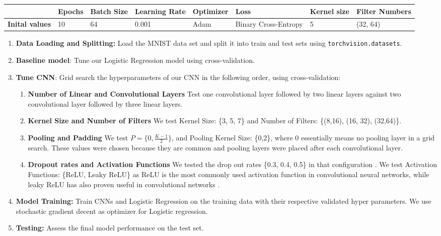 \begin{table}[]
\begin{tabular}{|l|l|l|l|l|l|l|l|}
\hline
                       & \textbf{Epochs} & \textbf{Batch Size} & \textbf{Learning Rate} & \textbf{Optimizer} & \textbf{Loss}        & \textbf{Kernel size} & \textbf{Filter Numbers} \\ \hline
\textbf{Inital values} & 10              & 64                  & 0.001                  & Adam               & Binary Cross-Entropy & 5                    & (32, 64)                \\ \hline
\end{tabular}
\end{table}

\begin{enumerate}
    \item \textbf{Data Loading and Splitting:} Load the MNIST data set and split it into train and test sets using     \texttt{torchvision.datasets}. 
    \item \textbf{Baseline model}: Tune our Logistic Regression model using cross-validation.
    \item \textbf{Tune CNN}: Grid search the hyperparameters of our CNN in the following order, using cross-validation:
    \begin{enumerate}
        \item \textbf{Number of Linear and Convolutional Layers} Test one convolutional layer followed by two linear layers against two convolutional layer followed by three linear layers.
        \item \textbf{Kernel Size and Number of Filters}
        We test Kernel Size: \{3, 5, 7\} and Number of Filters: \{(8,16), (16, 32), (32,64)\}.
        \item \textbf{Pooling and Padding}
        We test $P = \{0,\frac {K-1}2\}$, and Pooling Kernel Size: \{0,2\}, where $0$ essentially means no pooling layer in a grid search. These values were chosen because they are common and pooling layers were placed after each convolutional layer.
        \item \textbf{Dropout rates and Activation Functions}
        We  tested the drop out rates \{0.3, 0.4, 0.5\} in that configuration \cite{openai2023chatgpt}.  We test Activation Functions: \{ReLU, Leaky ReLU\} as ReLU is the most commonly used activation function in convolutional neural networks, while leaky ReLU has also proven useful in convolutional networks \cite {activation_functions}.
    \end{enumerate}
    \item \textbf{Model Training:} Train CNNs and Logistic Regression on the training data with their respective validated hyper parameters. We use stochastic gradient decent as optimizer for Logistic regression.
    \item \textbf{Testing:} Assess the final model performance on the test set. 
\end{enumerate}


